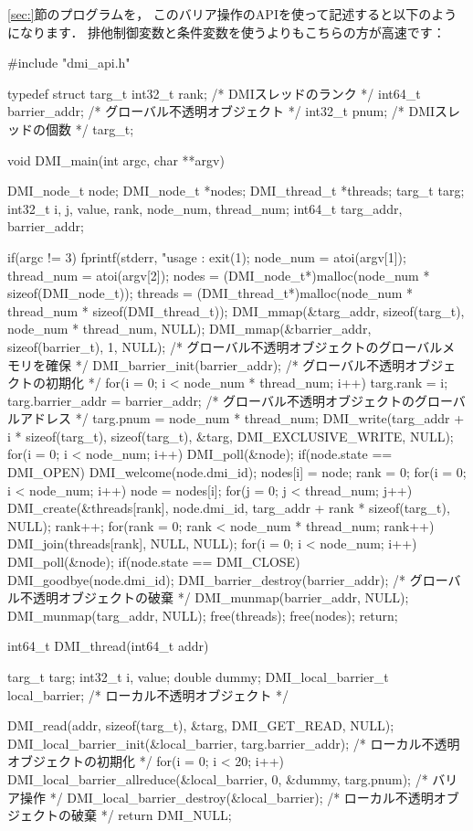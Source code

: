 \documentclass[report,12pt]{jsbook}
\begin{document}
\ref{sec:}節のプログラムを，
このバリア操作のAPIを使って記述すると以下のようになります．
排他制御変数と条件変数を使うよりもこちらの方が高速です：
\begin{code}
#include "dmi_api.h"

typedef struct targ_t
{
  int32_t rank;  /* DMIスレッドのランク */
  int64_t barrier_addr;  /* グローバル不透明オブジェクト */
  int32_t pnum;  /* DMIスレッドの個数 */
}targ_t;

void DMI_main(int argc, char **argv)
{
  DMI_node_t node;
  DMI_node_t *nodes;
  DMI_thread_t *threads;
  targ_t targ;
  int32_t i, j, value, rank, node_num, thread_num;
  int64_t targ_addr, barrier_addr;
  
  if(argc != 3)
    {
      fprintf(stderr, "usage : %
      exit(1);
    }
  node_num = atoi(argv[1]);
  thread_num = atoi(argv[2]);
  nodes = (DMI_node_t*)malloc(node_num * sizeof(DMI_node_t));
  threads = (DMI_thread_t*)malloc(node_num * thread_num * sizeof(DMI_thread_t));
  DMI_mmap(&targ_addr, sizeof(targ_t), node_num * thread_num, NULL);
  DMI_mmap(&barrier_addr, sizeof(barrier_t), 1, NULL);  /* グローバル不透明オブジェクトのグローバルメモリを確保 */
  DMI_barrier_init(barrier_addr);  /* グローバル不透明オブジェクトの初期化 */
  for(i = 0; i < node_num * thread_num; i++)
    {
      targ.rank = i;
      targ.barrier_addr = barrier_addr;  /* グローバル不透明オブジェクトのグローバルアドレス */
      targ.pnum = node_num * thread_num;
      DMI_write(targ_addr + i * sizeof(targ_t), sizeof(targ_t), &targ, DMI_EXCLUSIVE_WRITE, NULL);
    }
  for(i = 0; i < node_num; i++)
    {
      DMI_poll(&node);
      if(node.state == DMI_OPEN)
        {
          DMI_welcome(node.dmi_id);
          nodes[i] = node;
        }
    }
  rank = 0;
  for(i = 0; i < node_num; i++)
    {
      node = nodes[i];
      for(j = 0; j < thread_num; j++)
        {
          DMI_create(&threads[rank], node.dmi_id, targ_addr + rank * sizeof(targ_t), NULL);
          rank++;
        }
    }
  for(rank = 0; rank < node_num * thread_num; rank++)
    {
      DMI_join(threads[rank], NULL, NULL);
    }
  for(i = 0; i < node_num; i++)
    {
      DMI_poll(&node);
      if(node.state == DMI_CLOSE)
        {
          DMI_goodbye(node.dmi_id);
        }
    }
  DMI_barrier_destroy(barrier_addr);  /* グローバル不透明オブジェクトの破棄 */
  DMI_munmap(barrier_addr, NULL);
  DMI_munmap(targ_addr, NULL);
  free(threads);
  free(nodes);
  return;
}

int64_t DMI_thread(int64_t addr)
{
  targ_t targ;
  int32_t i, value;
  double dummy;
  DMI_local_barrier_t local_barrier;  /* ローカル不透明オブジェクト */
  
  DMI_read(addr, sizeof(targ_t), &targ, DMI_GET_READ, NULL);
  DMI_local_barrier_init(&local_barrier, targ.barrier_addr);  /* ローカル不透明オブジェクトの初期化 */
  for(i = 0; i < 20; i++)
    {
      DMI_local_barrier_allreduce(&local_barrier, 0, &dummy, targ.pnum);  /* バリア操作 */
    }
  DMI_local_barrier_destroy(&local_barrier);  /* ローカル不透明オブジェクトの破棄 */
  return DMI_NULL;
}
\end{code}
\end{document}
